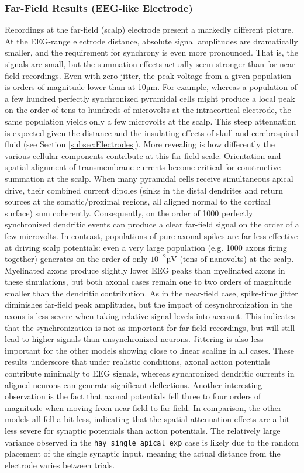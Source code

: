 \documentclass[final, a4paper,masters,en,listoffigures,listoftables,norwegiandates]{NMBU}
\begin{document}
\subsubsection{Far-Field Results (EEG-like Electrode)}
Recordings at the far-field (scalp) electrode present a markedly different picture. At the EEG-range electrode distance, absolute signal amplitudes are dramatically smaller, and the requirement for synchrony is even more pronounced. That is, the signals are small, but the summation effects actually seem stronger than for near-field recordings. Even with zero jitter, the peak voltage from a given population is orders of magnitude lower than at 10µm. For example, whereas a population of a few hundred perfectly synchronized pyramidal cells might produce a local peak on the order of tens to hundreds of microvolts at the intracortical electrode, the same population yields only a few microvolts at the scalp. This steep attenuation is expected given the distance and the insulating effects of skull and cerebrospinal fluid (see Section \ref{subsec:Electrodes}). More revealing is how differently the various cellular components contribute at this far-field scale. Orientation and spatial alignment of transmembrane currents become critical for constructive summation at the scalp. When many pyramidal cells receive simultaneous apical drive, their combined current dipoles (sinks in the distal dendrites and return sources at the somatic/proximal regions, all aligned normal to the cortical surface) sum coherently. Consequently, on the order of 1000 perfectly synchronized dendritic events can produce a clear far-field signal on the order of a few microvolts. In contrast, populations of pure axonal spikes are far less effective at driving scalp potentials: even a very large population (e.g. 1000 axons firing together) generates on the order of only $10^{-2}$µV (tens of nanovolts) at the scalp. Myelinated axons produce slightly lower EEG peaks than myelinated axons in these simulations, but both axonal cases remain one to two orders of magnitude smaller than the dendritic contribution. 
As in the near-field case, spike-time jitter diminishes far-field peak amplitudes, but the impact of desynchronization in the axons is less severe when taking relative signal levels into account. This indicates that the synchronization is not as important for far-field recordings, but will still lead to higher signals than unsynchronized neurons. Jittering is also less important for the other models showing close to linear scaling in all cases. These results underscore that under realistic conditions, axonal action potentials contribute minimally to EEG signals, whereas synchronized dendritic currents in aligned neurons can generate significant deflections. Another interesting observation is the fact that axonal potentials fell three to four orders of magnitude when moving from near-field to far-field. In comparison, the other models all fell a bit less, indicating that the spatial attenuation effects are a bit less severe for synaptic potentials than action potentials. The relatively large variance observed in the \texttt{hay\_single\_apical\_exp} case is likely due to the random placement of the single synaptic input, meaning the actual distance from the electrode varies between trials.
\end{document}
